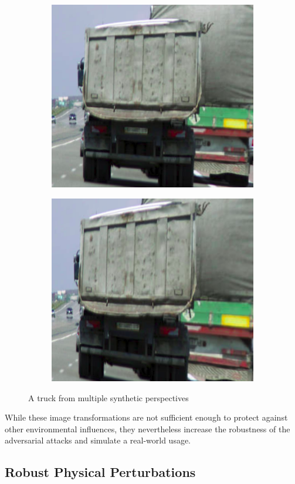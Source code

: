 \begin{figure}
\begin{subfigure}{.19\linewidth}
\end{subfigure}
\begin{subfigure}{.19\linewidth}
  \centering
  \includegraphics[width=0.7\linewidth]{imgs/truck_example/truck_l}
\end{subfigure}
\begin{subfigure}{.19\linewidth}
  \centering
  \includegraphics[width=0.7\linewidth]{imgs/truck_example/truck_ll}
\end{subfigure}
\caption{A truck from multiple synthetic perspectives}
\label{fig:truck_perspectives}
\end{figure}

While these image transformations are not sufficient enough to protect against other environmental influences, they nevertheless increase the robustness of the adversarial attacks and simulate a real-world usage.

\subsection{Robust Physical Perturbations}\label{subsec:robustphysical}

